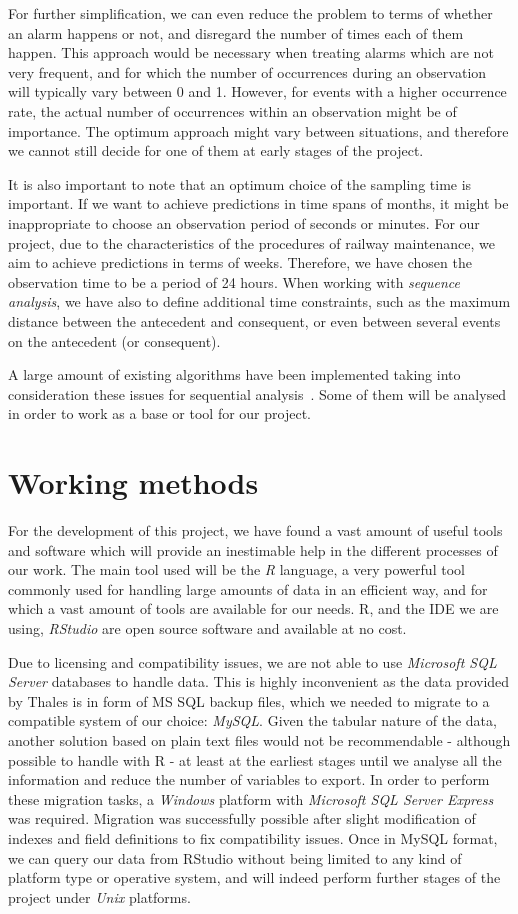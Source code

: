 \documentclass[a4paper,10pt]{report}
\begin{document}
For further simplification, we can even reduce the problem to terms of whether an alarm happens or not, and disregard the number of times each of them happen. This approach would be necessary when treating alarms which are not very frequent, and for which the number of occurrences during an observation will typically vary between 0 and 1. However, for events with a higher occurrence rate, the actual number of occurrences within an observation might be of importance. The optimum approach might vary between situations, and therefore we cannot still decide for one of them at early stages of the project.

It is also important to note that an optimum choice of the sampling time is important. If we want to achieve predictions in time spans of months, it might be inappropriate to choose an observation period of seconds or minutes. For our project, due to the characteristics of the procedures of railway maintenance, we aim to achieve predictions in terms of weeks. Therefore, we have chosen the observation time to be a period of 24 hours. When working with \emph{sequence analysis}, we have also to define additional time constraints\cite{Suh2011}, such as the maximum distance between the antecedent and consequent, or even between several events on the antecedent (or consequent).

A large amount of existing algorithms have been implemented taking into consideration these issues for sequential analysis~\cite{Wu2010}. Some of them will be analysed in order to work as a base or tool for our project.

\section{Working methods}
For the development of this project, we have found a vast amount of useful tools and software which will provide an inestimable help in the different processes of our work. The main tool used will be the \emph{R} language, a very powerful tool commonly used for handling large amounts of data in an efficient way, and for which a vast amount of tools are available for our needs. R, and the IDE we are using, \emph{RStudio} are open source software and available at no cost.

Due to licensing and compatibility issues, we are not able to use \emph{Microsoft SQL Server} databases to handle data. This is highly inconvenient as the data provided by Thales is in form of MS SQL backup files, which we needed to migrate to a compatible system of our choice: \emph{MySQL}. Given the tabular nature of the data, another solution based on plain text files would not be recommendable - although possible to handle with R - at least at the earliest stages until we analyse all the information and reduce the number of variables to export. In order to perform these migration tasks, a \emph{Windows} platform with \emph{Microsoft SQL Server Express} was required. Migration was successfully possible after slight modification of indexes and field definitions to fix compatibility issues. Once in MySQL format, we can query our data from RStudio without being limited to any kind of platform type or operative system, and will indeed perform further stages of the project under \emph{Unix} platforms.
\end{document}

